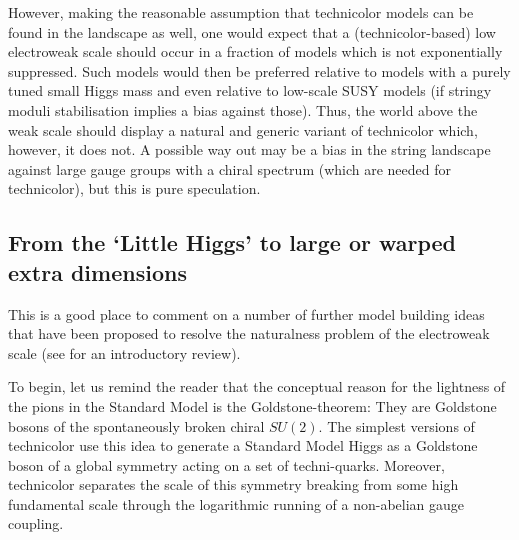 \documentclass[12pt]{article}
\numberwithin{equation}{section}
\begin{document}
However, making the reasonable assumption that technicolor models can be found in the landscape as well, one would expect that a (technicolor-based) low electroweak scale should occur in a fraction of models which is not exponentially suppressed. Such models would then be preferred relative to models with a purely tuned small Higgs mass and even relative to low-scale SUSY models (if stringy moduli stabilisation implies a bias against those). Thus, the world above the weak scale should display a natural and generic variant of technicolor which, however, it does not. A possible way out may be a bias in the string landscape against large gauge groups with a chiral spectrum (which are needed for technicolor), but this is pure speculation.






\subsection{From the `Little Higgs' to large or warped extra dimensions}\label{lhm}

This is a good place to comment on a number of further model building ideas that have been proposed to resolve the naturalness problem of the electroweak scale (see \cite{Csaki:2018muy} for an introductory review).

To begin, let us remind the reader that the conceptual reason for the lightness of the pions in the Standard Model is the Goldstone-theorem: They are Goldstone bosons of the spontaneously broken chiral $SU(2)$. The simplest versions of technicolor use this idea to generate a Standard Model Higgs as a Goldstone boson of a global symmetry acting on a set of techni-quarks. Moreover, technicolor separates the scale of this symmetry breaking from some high fundamental scale through the logarithmic running of a non-abelian gauge coupling.
\end{document}
